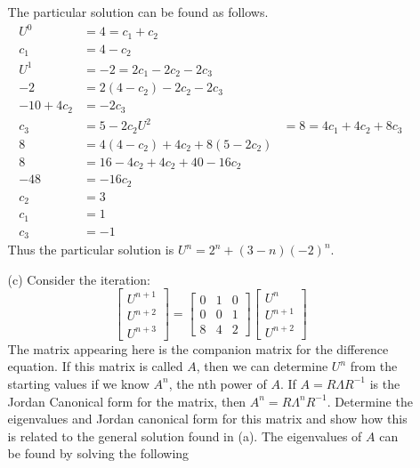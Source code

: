 \documentclass[11pt, oneside, titlepage]{article}
\begin{document}
\begin{enumerate}
\begin{enumerate}
                The particular solution can be found as follows.
                \begin{align*}
                    U^0 &= 4 = c_1 + c_2 \\
                    c_1 &= 4 - c_2 \\
                    U^1 &= -2 = 2 c_1 - 2 c_2 - 2c_3 \\
                    -2 &= 2(4 - c_2) - 2 c_2 - 2 c_3 \\
                    -10 + 4 c_2 &= -2 c_3 \\
                    c_3 &= 5 - 2 c_2
                    U^2 &= 8 = 4c_1 + 4c_2 + 8c_3 \\
                    8 &= 4(4 - c_2) + 4c_2 + 8(5 - 2c_2) \\
                    8 &= 16 - 4c_2 + 4c_2 + 40 - 16c_2 \\
                    -48 &= -16c_2 \\
                    c_2 &= 3 \\
                    c_1 &= 1 \\
                    c_3 &= -1 
                \end{align*}
                Thus the particular solution is $U^n = 2^n + (3 - n)(-2)^n$.

            \item[(c)]
                Consider the iteration:
                \[
                    \begin{bmatrix}
                        U^{n+1} \\
                        U^{n+2} \\
                        U^{n+3}
                    \end{bmatrix}
                    =
                    \begin{bmatrix}
                        0 & 1 & 0 \\
                        0 & 0 & 1 \\
                        8 & 4 & 2
                    \end{bmatrix}
                    \begin{bmatrix}
                        U^n \\
                        U^{n+1} \\
                        U^{n+2}
                    \end{bmatrix}
                \]
                The matrix appearing here is the companion matrix for the
                difference equation.
                If this matrix is called $A$, then we can determine $U^n$ from
                the starting values if we know $A^n$, the nth power of $A$.
                If $A = R\Lambda R^{-1}$ is the Jordan Canonical form for the
                matrix, then $A^n = R\Lambda^n R^{-1}$.
                Determine the eigenvalues and Jordan canonical form for this
                matrix and show how this is related to the general solution
                found in (a).
                The eigenvalues of $A$ can be found by solving the following


\end{enumerate}
\end{enumerate}
\end{document}
